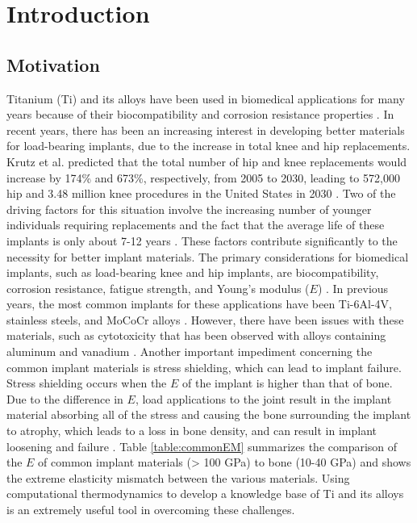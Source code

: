 \chapter{Introduction} \label{chapter1:introduction}

\section{\sloppy Motivation}
Titanium (Ti) and its alloys have been used in biomedical applications for many years because of their biocompatibility and corrosion resistance properties \cite{Long1998a}. In recent years, there has been an increasing interest in developing better materials for load-bearing implants, due to the increase in total knee and hip replacements. Krutz et al. predicted that the total number of hip and knee replacements would increase by 174\% and 673\%, respectively, from 2005 to 2030, leading to 572,000 hip and 3.48 million knee procedures in the United States in 2030 \cite{Kurtz2007}. Two of the driving factors for this situation involve the increasing number of younger individuals requiring replacements and the fact that the average life of these implants is only about 7-12 years \cite{Krishna2007a}. These factors contribute significantly to the necessity for better implant materials. The primary considerations for biomedical implants, such as load-bearing knee and hip implants, are biocompatibility, corrosion resistance, fatigue strength, and Young's modulus ($E$) \cite{Long1998a}. In previous years, the most common implants for these applications have been Ti-6Al-4V, stainless steels, and MoCoCr alloys \cite{Niinomi2003,Niinomi2012}. However, there have been issues with these materials, such as cytotoxicity that has been observed with alloys containing aluminum and vanadium \cite{Ito1995a}. Another important impediment concerning the common implant materials is stress shielding, which can lead to implant failure. Stress shielding occurs when the $E$ of the implant is higher than that of bone. Due to the difference in $E$, load applications to the joint result in the implant material absorbing all of the stress and causing the bone surrounding the implant to atrophy, which leads to a loss in bone density, and can result in implant loosening and failure \cite{Long1998a}.  Table \ref{table:commonEM} summarizes the comparison of the $E$ of common implant materials (> 100 GPa) to bone (10-40 GPa) \cite{Long1998a} and shows the extreme elasticity mismatch between the various materials. Using computational thermodynamics to develop a knowledge base of Ti and its alloys is an extremely useful tool in overcoming these challenges.

